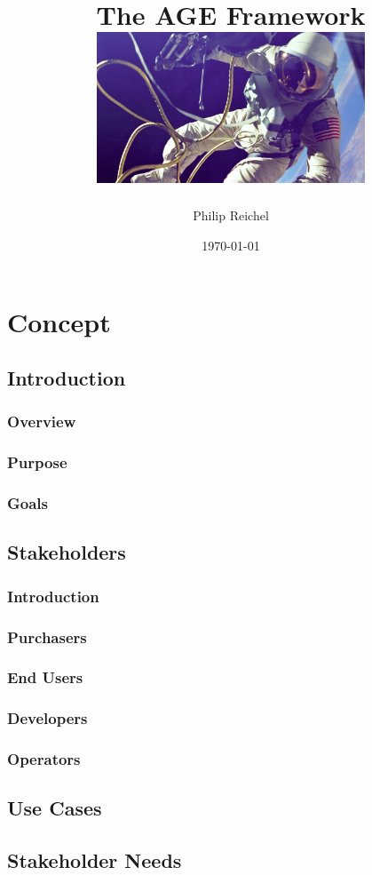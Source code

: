 \documentclass[a4paper,12pt]{book}
\title{
The AGE Framework
\linebreak
\linebreak
\includegraphics[width=8cm]{spacewalk.png}
}
\author{Philip Reichel}
\date{\today}
\begin{document}
\maketitle
\tableofcontents

\part{Concept}

\chapter{Introduction}
\section{Overview}
\section{Purpose}
\section{Goals}

\chapter{Stakeholders}
\section{Introduction}
\section{Purchasers}
\section{End Users}
\section{Developers}
\section{Operators}

\chapter{Use Cases}

\chapter{Stakeholder Needs}
\end{document}
